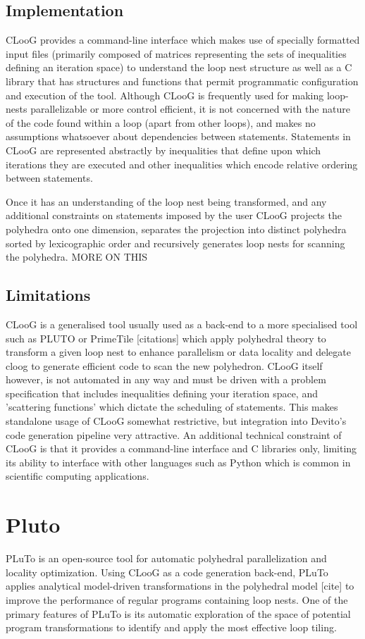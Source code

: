 \documentclass[a4paper,12pt,twoside]{report}
\begin{document}
\subsection*{Implementation}
CLooG provides a command-line interface which makes use of specially formatted input files (primarily composed of matrices representing
the sets of inequalities defining an iteration space) to understand the loop nest structure as well as a C library that has structures and
functions that permit programmatic configuration and execution of the tool.
Although CLooG is frequently used for making loop-nests parallelizable or more control efficient, it is not concerned with the nature of the
code found within a loop (apart from other loops), and makes no assumptions whatsoever about dependencies between statements.
Statements in CLooG are represented abstractly by inequalities that define upon which iterations they are executed and other inequalities
which encode relative ordering between statements.

Once it has an understanding of the loop nest being transformed, and any additional constraints on statements imposed by the user
CLooG projects the polyhedra onto one dimension, separates the projection into distinct polyhedra sorted by lexicographic order and 
recursively generates loop nests for scanning the polyhedra. MORE ON THIS

\subsection*{Limitations}
CLooG is a generalised tool usually used as a back-end to a more specialised tool such as PLUTO or PrimeTile [citations] which
apply polyhedral theory to transform a given loop nest to enhance parallelism or data locality and delegate cloog to generate
efficient code to scan the new polyhedron. CLooG itself however, is not automated in any way and must be driven with a problem
specification that includes inequalities defining your iteration space, and 'scattering functions' which dictate the scheduling
of statements. This makes standalone usage of CLooG somewhat restrictive, but integration into Devito's code generation pipeline
very attractive. An additional technical constraint of CLooG is that it provides a command-line interface and C libraries only,
limiting its ability to interface with other languages such as Python which is common in scientific computing applications.

\section{Pluto}
PLuTo is an open-source tool for automatic polyhedral parallelization and locality optimization. Using CLooG as a code generation
back-end, PLuTo applies analytical model-driven transformations in the polyhedral model [cite] to improve the performance
of regular programs containing loop nests. One of the primary features of PLuTo is its automatic exploration of the space
of potential program transformations to identify and apply the most effective loop tiling.
\end{document}
